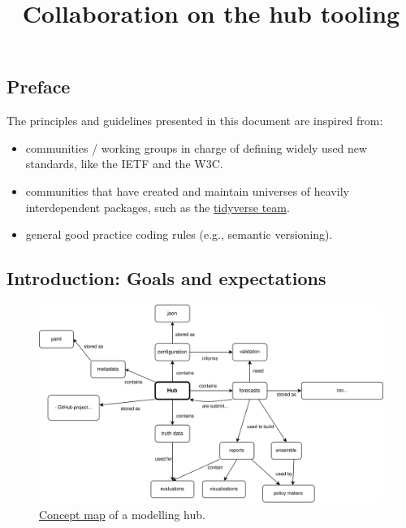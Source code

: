 \documentclass[
  letterpaper,
  DIV=11,
  numbers=noendperiod]{scrartcl}
\title{Collaboration on the hub tooling}
\author{}
\date{}
\providecommand{\tightlist}{%
  \setlength{\itemsep}{0pt}\setlength{\parskip}{0pt}}
\begin{document}
\maketitle

\hypertarget{preface}{%
\subsection{Preface}\label{preface}}

The principles and guidelines presented in this document are inspired
from:

\begin{itemize}
\tightlist
\item
  communities / working groups in charge of defining widely used new
  standards, like the IETF and the W3C.
\item
  communities that have created and maintain universes of heavily
  interdependent packages, such as the
  \href{https://github.com/tidyverse}{tidyverse team}.
\item
  general good practice coding rules (e.g., semantic versioning).
\end{itemize}

\hypertarget{introduction-goals-and-expectations}{%
\subsection{Introduction: Goals and
expectations}\label{introduction-goals-and-expectations}}

\begin{figure}

{\centering \includegraphics{concept_map.svg}

}

\caption{\label{fig-concept-map}\href{https://en.wikipedia.org/wiki/Concept_map}{Concept
map} of a modelling hub.}

\end{figure}
\end{document}
